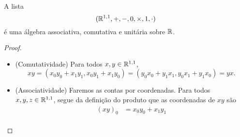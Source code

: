 \begin{proposition}
A lista
	\begin{equation*}
	(\mathbb{R}^{1,1},+,-,0,\times,1,\cdot)
	\end{equation*}
é uma álgebra associativa, comutativa e unitária sobre $\mathbb{R}$.
\end{proposition}
\begin{proof}
\begin{itemize}
	\item (Comutatividade) Para todos $x,y \in \mathbb{R}^{1,1}$,
		\begin{equation*}
		xy = (x_0y_0 + x_1y_1,x_0y_1+x_1y_0) = (y_0x_0 + y_1x_1, y_0x_1+y_1x_0) = yx.
		\end{equation*}
	\item %
		(Associatividade) Faremos as contas por coordenadas. Para todos $x,y,z \in \mathbb{R}^{1,1}$, segue da definição do produto que as coordenadas de $xy$ são
			\begin{align*}
			(xy)_0 &= x_0y_0 + x_1y_1 \\

\end{align*}
\end{itemize}
\end{proof}
